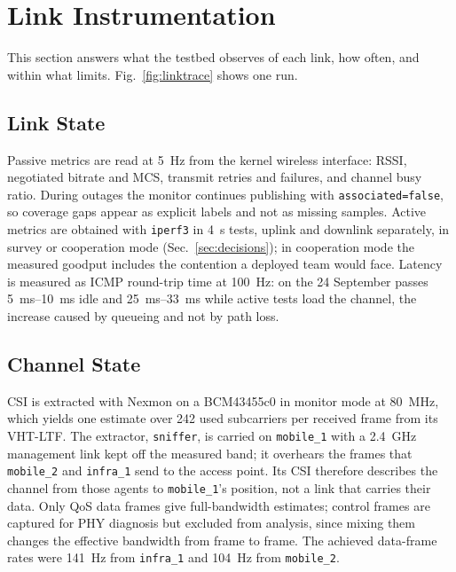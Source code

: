 \section{Link Instrumentation}
\label{sec:link}
This section answers what the testbed observes of each link, how
often, and within what limits. Fig.~\ref{fig:linktrace} shows one run.


\subsection{Link State}
Passive metrics are read at \SI{5}{\hertz} from the kernel wireless
interface: RSSI, negotiated bitrate and MCS, transmit retries and
failures, and channel busy ratio. During outages the monitor continues
publishing with \texttt{associated=false}, so coverage gaps appear as
explicit labels and not as missing samples. Active metrics are
obtained with \texttt{iperf3} \cite{iperf3} in \SI{4}{\second} tests,
uplink and downlink separately, in survey or cooperation mode
(Sec.~\ref{sec:decisions}); in cooperation mode the measured goodput
includes the contention a deployed team would face. Latency is
measured as ICMP round-trip time at \SI{100}{\hertz}: on the 24
September passes \SIrange{5}{10}{\milli\second} idle and
\SIrange{25}{33}{\milli\second} while active tests load the channel,
the increase caused by queueing and not by path loss.

\subsection{Channel State}
\label{sec:csi}
CSI is extracted with Nexmon \cite{nexmon} on a BCM43455c0 in monitor
mode at \SI{80}{\mega\hertz}, which yields one estimate over 242 used
subcarriers per received frame from its VHT-LTF. The extractor,
\texttt{sniffer}, is carried on \texttt{mobile\_1} with a
\SI{2.4}{\giga\hertz} management link kept off the measured band; it
overhears the frames that \texttt{mobile\_2} and \texttt{infra\_1}
send to the access point. Its CSI therefore describes the channel from
those agents to \texttt{mobile\_1}'s position, not a link that carries
their data. Only
QoS data frames give full-bandwidth estimates; control frames are
captured for PHY diagnosis but excluded from analysis, since mixing
them changes the effective bandwidth from frame to frame. The achieved
data-frame rates were \SI{141}{\hertz} from \texttt{infra\_1} and
\SI{104}{\hertz} from \texttt{mobile\_2}.

